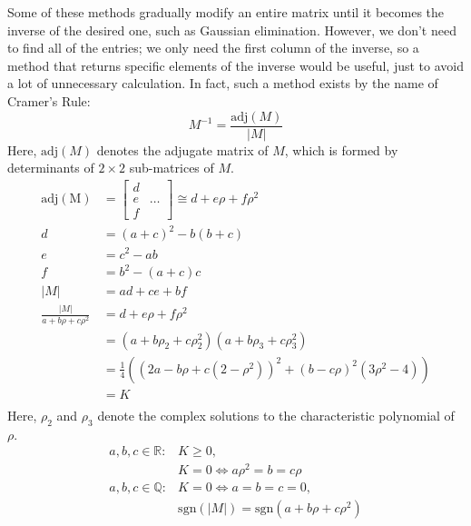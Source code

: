\documentclass{article}
\begin{document}
Some of these methods gradually modify an entire matrix
until it becomes the inverse of the desired one,
such as Gaussian elimination.
However, we don't need to find all of the entries;
we only need the first column of the inverse,
so a method that returns specific elements of the inverse would be useful,
just to avoid a lot of unnecessary calculation.
In fact, such a method exists by the name of Cramer's Rule:
\[M^{-1} = \frac{\mathrm{adj}(M)}{\lvert M \rvert}\]
Here, $\mathrm{adj}(M)$ denotes the adjugate matrix of $M$,
which is formed by determinants of $2 \times 2$ sub-matrices of $M$.
\begin{align*}
  \mathrm{adj(M)} &=
  \begin{bmatrix}
    d & \\
    e & \hdots \\
    f &
  \end{bmatrix}
  \cong d+e\rho+f\rho^2 \\
  d &=
  (a+c)^2-b(b+c) \\
  e &=
  c^2-ab \\
  f &=
  b^2-(a+c)c \\
  \lvert M \rvert &= ad+ce+bf \\
  \frac{\lvert M \rvert}{a+b\rho+c\rho^2}
  &= d+e\rho+f\rho^2 \\
  &= (a+b\rho_2+c\rho_2^2)(a+b\rho_3+c\rho_3^2) \\
  &= \frac{1}{4}\left((2a-b\rho+c(2-\rho^2))^2+(b-c\rho)^2(3\rho^2-4)\right) \\
  &= K \\
\end{align*}
Here, $\rho_2$ and $\rho_3$ denote the complex solutions
to the characteristic polynomial of $\rho$.
\begin{align*}
  a, b, c \in \mathbb{R}: & K \geq 0, \\
  & K = 0 \iff a\rho^2 = b = c\rho \\
  a, b, c \in \mathbb{Q}: & K = 0 \iff a = b = c = 0, \\
  & \mathrm{sgn}(\lvert M \rvert) = \mathrm{sgn}(a+b\rho+c\rho^2) \\
\end{align*}
\end{document}
